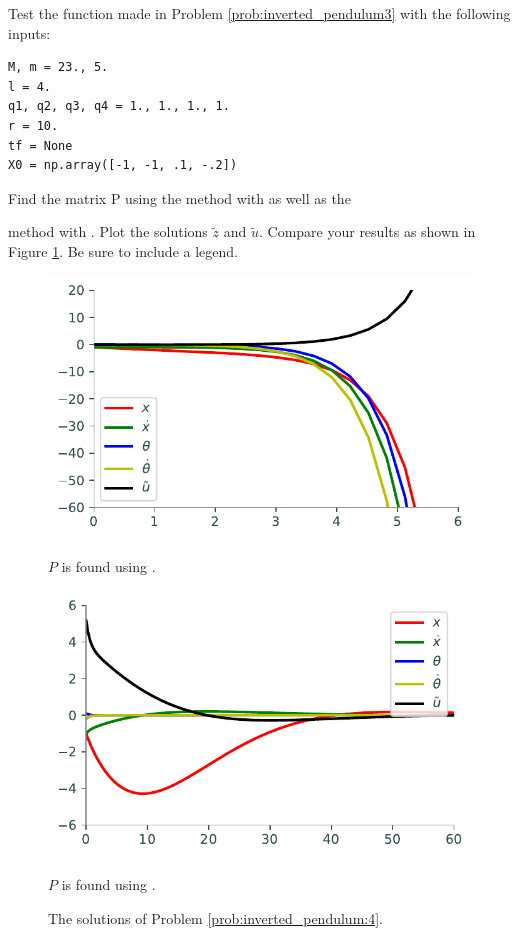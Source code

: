 \begin{problem}
Test the function made in Problem \eqref{prob:inverted_pendulum3} with the following inputs: 
\begin{lstlisting}
M, m = 23., 5.
l = 4.
q1, q2, q3, q4 = 1., 1., 1., 1.
r = 10.
tf = None
X0 = np.array([-1, -1, .1, -.2])
\end{lstlisting}
Find the matrix P using the  method with  as well as the

\noindent {} method with .
Plot the solutions $\tilde{z}$ and $\tilde{u}$. 
Compare your results as shown in Figure \ref{fig:inverted_pendulum:4}.
Be sure to include a legend.
\label{prob:inverted_pendulum:4}
\end{problem}

\begin{figure}
\begin{minipage}[b]{.47\linewidth}
\centering
\includegraphics[width=\textwidth]{figures/prob4_unstable.pdf}
\caption*{$P$ is found using .}
\end{minipage}
\hspace{0.5cm}
\begin{minipage}[b]{0.47\linewidth}
\centering
\includegraphics[width=\textwidth]{figures/prob4_stable.pdf}
\caption*{$P$ is found using .}
\end{minipage}
\caption{The solutions of Problem \ref{prob:inverted_pendulum:4}.}
\label{fig:inverted_pendulum:4}
\end{figure}

